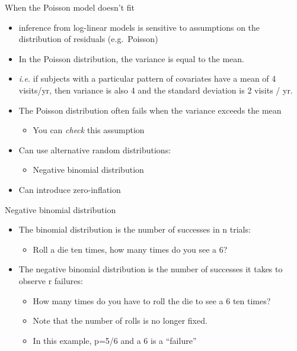 \documentclass[
  ignorenonframetext,
]{beamer}
\providecommand{\tightlist}{%
  \setlength{\itemsep}{0pt}\setlength{\parskip}{0pt}}
\begin{document}
\begin{frame}{When the Poisson model doesn't fit}
\protect\hypertarget{when-the-poisson-model-doesnt-fit}{}

\begin{itemize}
\tightlist
\item
  inference from log-linear models is sensitive to assumptions on the
  distribution of residuals (e.g.~Poisson)
\item
  In the Poisson distribution, the variance is equal to the mean.
\item
  \emph{i.e.} if subjects with a particular pattern of covariates have a
  mean of 4 visits/yr, then variance is also 4 and the standard
  deviation is 2 visits / yr.
\item
  The Poisson distribution often fails when the variance exceeds the
  mean

  \begin{itemize}
  \tightlist
  \item
    You can \emph{check} this assumption\\
  \end{itemize}
\item
  Can use alternative random distributions:

  \begin{itemize}
  \tightlist
  \item
    Negative binomial distribution
  \end{itemize}
\item
  Can introduce zero-inflation
\end{itemize}

\end{frame}

\begin{frame}{Negative binomial distribution}
\protect\hypertarget{negative-binomial-distribution}{}

\begin{itemize}
\tightlist
\item
  The binomial distribution is the number of successes in n trials:

  \begin{itemize}
  \tightlist
  \item
    Roll a die ten times, how many times do you see a 6?
  \end{itemize}
\item
  The negative binomial distribution is the number of successes it takes
  to observe r failures:

  \begin{itemize}
  \tightlist
  \item
    How many times do you have to roll the die to see a 6 ten times?
  \item
    Note that the number of rolls is no longer fixed.
  \item
    In this example, p=5/6 and a 6 is a ``failure''
  \end{itemize}
\end{itemize}

\end{frame}
\end{document}
